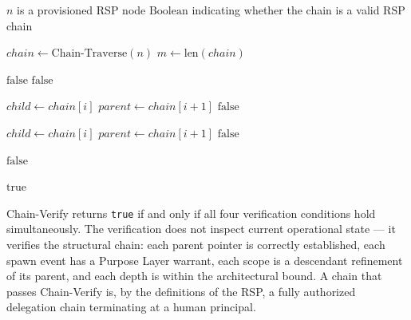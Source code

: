 \begin{algorithm}
\caption{Chain-Verify($n$) --- Verify the authorization chain from node $n$ to human anchor}
\label{alg:chain-verify}
\begin{algorithmic}[1]
\REQUIRE $n$ is a provisioned RSP node
\ENSURE $\text{Boolean}$ indicating whether the chain is a valid RSP chain

\STATE $chain \leftarrow \text{Chain-Traverse}(n)$
\STATE $m \leftarrow \text{len}(chain)$

\STATE {}
    \STATE \RETURN $\text{false}$ 
\ENDIF
{}
    \STATE \RETURN $\text{false}$ 
\ENDIF

\STATE {}
    \STATE $child \leftarrow chain[i]$
    \STATE $parent \leftarrow chain[i+1]$
        \STATE \RETURN $\text{false}$ 
    \ENDIF
\ENDFOR

\STATE {}
    \STATE $child \leftarrow chain[i]$
    \STATE $parent \leftarrow chain[i+1]$
        \STATE \RETURN $\text{false}$ 
    \ENDIF
\ENDFOR

\STATE {}
        \STATE \RETURN $\text{false}$ 
    \ENDIF
\ENDFOR

\RETURN $\text{true}$
\end{algorithmic}
\end{algorithm}

Chain-Verify returns \texttt{true} if and only if all four verification conditions hold simultaneously. The verification does not inspect current operational state --- it verifies the structural chain: each parent pointer is correctly established, each spawn event has a Purpose Layer warrant, each scope is a descendant refinement of its parent, and each depth is within the architectural bound. A chain that passes Chain-Verify is, by the definitions of the RSP, a fully authorized delegation chain terminating at a human principal.

